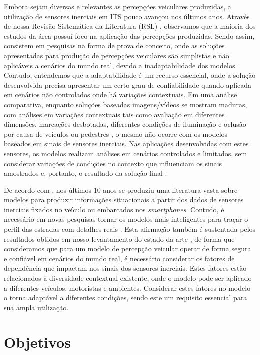 Embora sejam diversas e relevantes as percepções veiculares produzidas, a utilização de sensores inerciais em ITS pouco avançou nos últimos anos. Através de nossa Revisão Sistemática da Literatura (RSL) \cite{menegazzo2018,menegazzo2020}, observamos que a maioria dos estudos da área possuí foco na aplicação das percepções produzidas. Sendo assim, consistem em pesquisas na forma de prova de conceito, onde as soluções apresentadas para produção de percepções veiculares são simplistas e não aplicáveis a cenários do mundo real, devido a inadaptabilidade dos modelos. Contudo, entendemos que a adaptabilidade é um recurso essencial, onde a solução desenvolvida precisa apresentar um certo grau de confiabilidade quando aplicada em cenários não controlados onde há variações contextuais. Em uma análise comparativa, enquanto soluções baseadas imagens/vídeos se mostram maduras, com análises em variações contextuais tais como avaliação em diferentes dimensões, marcações desbotadas, diferentes condições de iluminação e oclusão por causa de veículos ou pedestres \cite{Srimongkon2017, Patil2020}, o mesmo não ocorre com os modelos baseados em sinais de sensores inerciais. Nas aplicações desenvolvidas com estes sensores, os modelos realizam análises em cenários controlados e limitados, sem considerar variações de condições no contexto que influenciam os sinais amostrados e, portanto, o resultado da solução final \cite{menegazzo2018,menegazzo2020}.

De acordo com \cite{Carlos2019}, nos últimos 10 anos se produziu uma literatura vasta sobre modelos para produzir informações situacionais a partir dos dados de sensores inerciais fixados no veículo ou embarcados nos \textit{smartphones}. Contudo, é necessário em novas pesquisas tornar os modelos mais inteligentes para traçar o perfil das estradas com detalhes reais \cite{Carlos2019}. Esta afirmação também é sustentada pelos resultados obtidos em nosso levantamento do estado-da-arte \cite{menegazzo2018,menegazzo2020}, de forma que consideramos que para um modelo de percepção veicular operar de forma segura e confiável em cenários do mundo real, é necessário considerar os fatores de dependência que impactam nos sinais dos sensores inerciais. Estes fatores estão relacionados à diversidade contextual existente, onde o modelo pode ser aplicado a diferentes veículos, motoristas e ambientes. Considerar estes fatores no modelo o torna adaptável a diferentes condições, sendo este um requisito essencial para sua ampla utilização.

\section{Objetivos}

